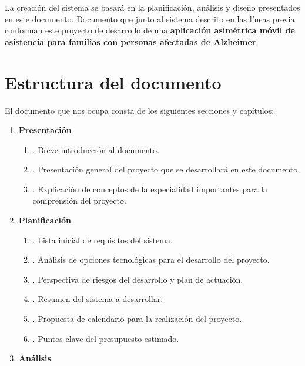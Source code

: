 La creación del sistema se basará en la planificación, análisis y diseño presentados en este documento. Documento que junto al sistema descrito en las líneas previa conforman este proyecto de desarrollo de una \textbf{aplicación asimétrica móvil de asistencia para familias con personas afectadas de Alzheimer}.

\section{Estructura del documento}

El documento que nos ocupa consta de los siguientes secciones y capítulos:

\begin{enumerate}
    \item \textbf{Presentación}
    \begin{enumerate}
    	\item \textbf{}. Breve introducción al documento.
    	\item \textbf{}. Presentación general del proyecto que se desarrollará en este documento.
    	\item \textbf{}. Explicación de conceptos de la especialidad importantes para la comprensión del proyecto.
	\end{enumerate}
    \item \textbf{Planificación}
    \begin{enumerate}
    	\item \textbf{}. Lista inicial de requisitos del sistema.
    	\item \textbf{}. Análisis de opciones tecnológicas para el desarrollo del proyecto.
    	\item \textbf{}. Perspectiva de riesgos del desarrollo y plan de actuación.
    	\item \textbf{}. Resumen del sistema a desarrollar.
    	\item \textbf{}. Propuesta de calendario para la realización del proyecto.
    	\item \textbf{}. Puntos clave del presupuesto estimado.
	\end{enumerate}
    \item \textbf{Análisis}
    \begin{enumerate}

\end{enumerate}
\end{enumerate}
